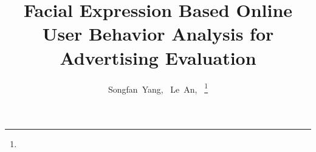 \documentclass[10pt,journal,cspaper,compsoc]{IEEEtran}
\begin{document}
%
\title{Facial Expression Based Online User Behavior Analysis for Advertising Evaluation}
%
%
%
%

\author{Songfan~Yang,~
        Le~An,~
\thanks{}}
\end{document}
